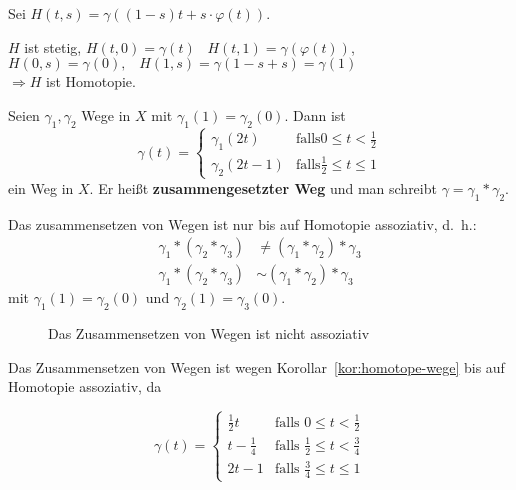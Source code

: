 \begin{beweis}
    Sei $H (t,s) = \gamma ((1-s) t + s \cdot \varphi(t))$.

    $H$ ist stetig, $H(t,0) = \gamma(t)\;\;\; H(t,1) = \gamma ( \varphi(t))$,
    $H(0,s) = \gamma(0),\;\;\; H(1,s) = \gamma(1-s+s) = \gamma(1)$\\
    $\Rightarrow H$ ist Homotopie.
\end{beweis}

\begin{definition}
    Seien $\gamma_1, \gamma_2$ Wege in $X$ mit $\gamma_1(1) = \gamma_2(0)$.
    Dann ist 
    \[\gamma (t) = \begin{cases}
        \gamma_1(2t)   &\text{falls} 0 \leq t < \frac{1}{2}\\
        \gamma_2(2t-1) &\text{falls} \frac{1}{2} \leq t \leq 1
      \end{cases}\]
    ein Weg in $X$. Er heißt \textbf{zusammengesetzter Weg} und man
    schreibt $\gamma = \gamma_1 * \gamma_2$.
\end{definition}

\begin{korollar}\label{kor:assoziativitaet-von-zusammensetzen-von-wegen}
    Das zusammensetzen von Wegen ist nur bis auf 
    Homotopie assoziativ, d.~h.:
    \begin{align*}
        \gamma_1 * (\gamma_2 * \gamma_3) &\neq (\gamma_1 * \gamma_2) * \gamma_3\\
        \gamma_1 * (\gamma_2 * \gamma_3) &\sim (\gamma_1 * \gamma_2) * \gamma_3
    \end{align*}
    mit $\gamma_1(1)=\gamma_2(0)$ und $\gamma_2(1) = \gamma_3(0)$.
\end{korollar}

\begin{beweis}
    \begin{figure}[ht]
        \centering
        \label{fig:assoziativitaet-von-wegen}
        \caption{Das Zusammensetzen von Wegen ist nicht assoziativ}
    \end{figure}

    Das Zusammensetzen von Wegen ist wegen Korollar~\ref{kor:homotope-wege}
    bis auf Homotopie assoziativ, da

    \[\gamma(t) = \begin{cases}
            \frac{1}{2} t   &\text{falls } 0 \leq t < \frac{1}{2}\\
            t - \frac{1}{4} &\text{falls } \frac{1}{2} \leq t < \frac{3}{4}\\
            2t - 1          &\text{falls } \frac{3}{4} \leq t \leq 1
        \end{cases}\]
\end{beweis}

